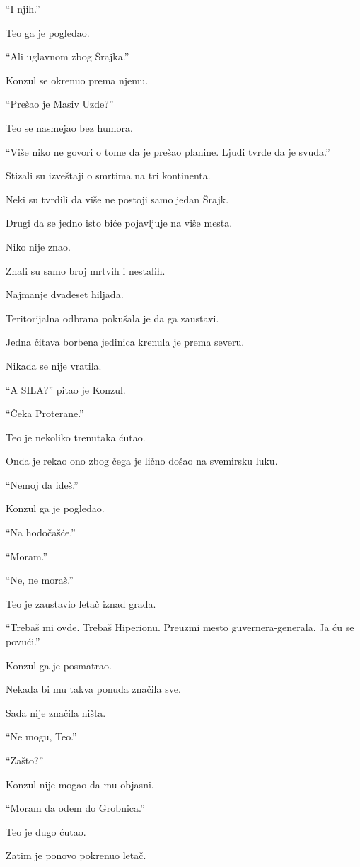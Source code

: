 ``I njih.''

Teo ga je pogledao.

``Ali uglavnom zbog Šrajka.''

Konzul se okrenuo prema njemu.

``Prešao je Masiv Uzde?''

Teo se nasmejao bez humora.

``Više niko ne govori o tome da je prešao planine. Ljudi tvrde da je svuda.''

Stizali su izveštaji o smrtima na tri kontinenta.

Neki su tvrdili da više ne postoji samo jedan Šrajk.

Drugi da se jedno isto biće pojavljuje na više mesta.

Niko nije znao.

Znali su samo broj mrtvih i nestalih.

Najmanje dvadeset hiljada.

Teritorijalna odbrana pokušala je da ga zaustavi.

Jedna čitava borbena jedinica krenula je prema severu.

Nikada se nije vratila.

``A SILA?'' pitao je Konzul.

``Čeka Proterane.''

Teo je nekoliko trenutaka ćutao.

Onda je rekao ono zbog čega je lično došao na svemirsku luku.

``Nemoj da ideš.''

Konzul ga je pogledao.

``Na hodočašće.''

``Moram.''

``Ne, ne moraš.''

Teo je zaustavio letač iznad grada.

``Trebaš mi ovde. Trebaš Hiperionu. Preuzmi mesto guvernera-generala. Ja ću se povući.''

Konzul ga je posmatrao.

Nekada bi mu takva ponuda značila sve.

Sada nije značila ništa.

``Ne mogu, Teo.''

``Zašto?''

Konzul nije mogao da mu objasni.

``Moram da odem do Grobnica.''

Teo je dugo ćutao.

Zatim je ponovo pokrenuo letač.

